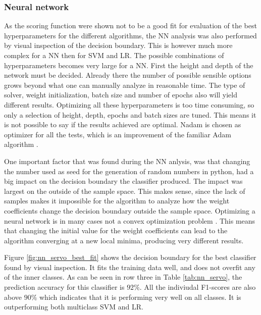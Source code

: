         \clearpage
        \subsubsection{Neural network}
            As the scoring function were shown not to be a good fit for evaluation of the best hyperparameters for the different algorithms, the NN analysis was also performed by visual inspection of the decision boundary. This is however much more complex for a NN then for SVM and LR. The possible combinations of hyperparameters becomes very large for a NN. First the height and depth of the network must be decided. Already there the number of possible sensible options grows beyond what one can manually analyze in reasonable time. The type of solver, weight initialization, batch size and number of epochs also will yield different results. Optimizing all these hyperparameters is too time consuming, so only a selection of height, depth, epochs and batch sizes are tuned. This means it is not possible to say if the results achieved are optimal. Nadam is chosen as optimizer for all the tests, which is an improvement of the familiar Adam algorithm \cite{Dozat}. 
            
            One important factor that was found during the NN anlysis, was that changing the number used as seed for the generation of random numbers in python, had a big impact on the decision boundary the classifier produced. The impact was largest on the outside of the sample space. This makes sense, since the lack of samples makes it impossible for the algorithm to analyze how the weight coefficients change the decision boundary outside the sample space. Optimizing a neural network is in many cases not a convex optimization problem \cite{Hastie}. This means that changing the initial value for the weight coefficients can lead to the algorithm converging at a new local minima, producing very different results.
            
            Figure \ref{fig:nn_servo_best_fit} shows the decision boundary for the best classifier found by visual inspection. It fits the training data well, and does not overfit any of the inner classes. As can be seen in row  three in Table \ref{tab:nn_servo}, the prediction accuracy for this classifier is $92\%$. All the indiviudal F1-scores are also above $90\%$ which indicates that it is performing very well on all classes. It is outperforming both multiclass SVM and LR. 
            
